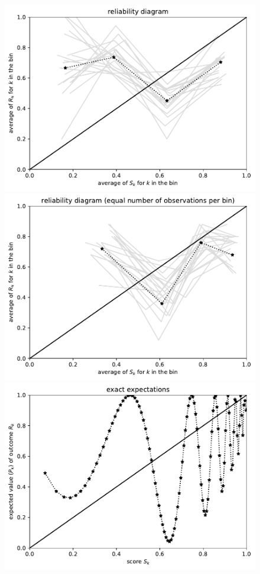 \documentclass{article}
\begin{document}
\begin{figure}
\begin{centering}
\parbox{\imsize}{\includegraphics[width=\imsize]
                {./codes/unweighted/100_4_2_1/equiprob.pdf}}
\quad\quad
\parbox{\imsize}{\includegraphics[width=\imsize]
                {./codes/unweighted/100_4_2_1/equisamp.pdf}}

\vspace{\vertsep}

\parbox{\imsize}{\includegraphics[width=\imsize]
                {./codes/unweighted/100_4_2_1/exact.pdf}}


\end{centering}
\end{figure}
\end{document}
